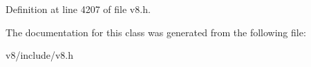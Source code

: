 Definition at line 4207 of file v8.\+h.



The documentation for this class was generated from the following file\+:\begin{DoxyCompactItemize}
\item 
v8/include/v8.\+h\end{DoxyCompactItemize}
